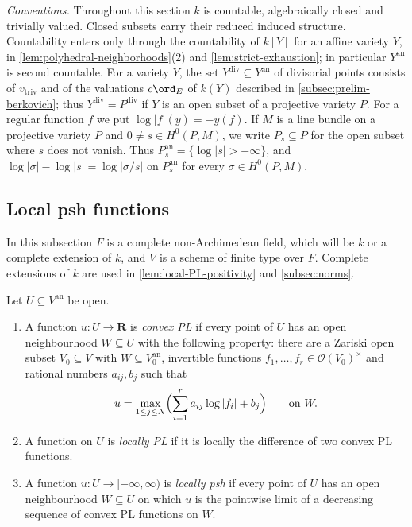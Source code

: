 \documentclass[11pt,a4paper]{article}
\newcommand{\an}{\mathrm{an}}          %
\newcommand{\divv}{\mathrm{div}}       %
\newcommand{\vtriv}{v_{\mathrm{triv}}} %
\begin{document}
\emph{Conventions.} Throughout this section $k$ is countable, algebraically closed and trivially valued. Closed subsets carry their reduced induced structure. Countability enters only through the countability of $k[Y]$ for an affine variety $Y$, in \cref{lem:polyhedral-neighborhoods}(2) and \cref{lem:strict-exhaustion}; in particular $Y^{\an}$ is second countable. For a variety $Y$, the set $Y^{\divv}\subseteq Y^{\an}$ of divisorial points consists of $\vtriv$ and of the valuations $c\ord_E$ of $k(Y)$ described in \cref{subsec:prelim-berkovich}; thus $Y^{\divv}=P^{\divv}$ if $Y$ is an open subset of a projective variety $P$. For a regular function $f$ we put $\log|f|(y)=-y(f)$. If $M$ is a line bundle on a projective variety $P$ and $0\ne s\in H^0(P,M)$, we write $P_s\subseteq P$ for the open subset where $s$ does not vanish. Thus $P_s^{\an}=\{\log|s|>-\infty\}$, and $\log|\sigma|-\log|s|=\log|\sigma/s|$ on $P_s^{\an}$ for every $\sigma\in H^0(P,M)$.

\subsection{Local psh functions}\label{subsec:local-definitions}

In this subsection $F$ is a complete non-Archimedean field, which will be $k$ or a complete extension of $k$, and $V$ is a scheme of finite type over $F$. Complete extensions of $k$ are used in \cref{lem:local-PL-positivity} and \cref{subsec:norms}.

\begin{definition}\label{def:local-psh}
Let $U\subseteq V^{\an}$ be open.
\begin{enumerate}
\item A function $u\colon U\to\mathbf R$ is \emph{convex PL} if every point of $U$ has an open neighbourhood $W\subseteq U$ with the following property: there are a Zariski open subset $V_0\subseteq V$ with $W\subseteq V_0^{\an}$, invertible functions $f_1,\ldots,f_r\in\mathcal O(V_0)^\times$ and rational numbers $a_{ij},b_j$ such that
\[
u=\max_{1\le j\le N}\Bigl(\sum_{i=1}^ra_{ij}\log|f_i|+b_j\Bigr)\qquad\text{on }W.
\]
\item A function on $U$ is \emph{locally PL} if it is locally the difference of two convex PL functions.
\item A function $u\colon U\to[-\infty,\infty)$ is \emph{locally psh} if every point of $U$ has an open neighbourhood $W\subseteq U$ on which $u$ is the pointwise limit of a decreasing sequence of convex PL functions on $W$.
\end{enumerate}
\end{definition}
\end{document}
